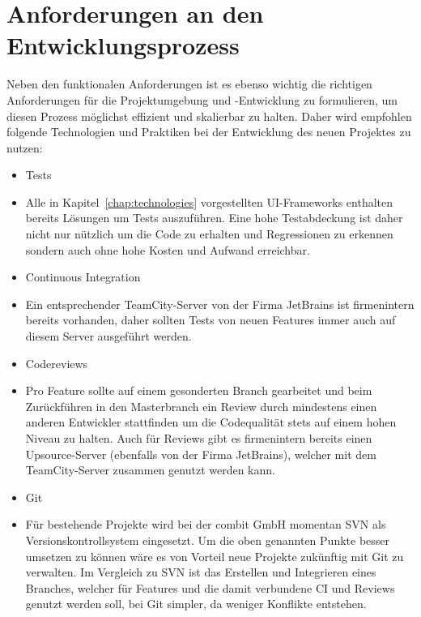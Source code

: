 \section{Anforderungen an den Entwicklungsprozess}
Neben den funktionalen Anforderungen ist es ebenso wichtig die richtigen Anforderungen für die Projektumgebung und -Entwicklung zu formulieren, um diesen Prozess möglichst effizient und skalierbar zu halten. Daher wird empfohlen folgende Technologien und Praktiken bei der Entwicklung des neuen Projektes zu nutzen:
\begin{itemize}
    \item{Tests}
    \item[] Alle in Kapitel~\ref{chap:technologies} vorgestellten UI-Frameworks enthalten bereits Lösungen um Tests auszuführen. Eine hohe Testabdeckung ist daher nicht nur nützlich um die Code zu erhalten und Regressionen zu erkennen sondern auch ohne hohe Kosten und Aufwand erreichbar.
    \item{Continuous Integration}
    \item[] Ein entsprechender TeamCity-Server von der Firma JetBrains ist firmenintern bereits vorhanden, daher sollten Tests von neuen Features immer auch auf diesem Server ausgeführt werden.
    \item{Codereviews}
    \item[] Pro Feature sollte auf einem gesonderten Branch gearbeitet und beim Zurückführen in den Masterbranch ein Review durch mindestens einen anderen Entwickler stattfinden um die Codequalität stets auf einem hohen Niveau zu halten. Auch für Reviews gibt es firmenintern bereits einen Upsource-Server (ebenfalls von der Firma JetBrains), welcher mit dem TeamCity-Server zusammen genutzt werden kann.
    \item{Git}
    \item[] Für bestehende Projekte wird bei der combit GmbH momentan SVN  als Versionskontrollsystem eingesetzt. Um die oben genannten Punkte besser umsetzen zu können wäre es von Vorteil neue Projekte zukünftig mit Git zu verwalten. Im Vergleich zu SVN ist das Erstellen und Integrieren eines Branches, welcher für Features und die damit verbundene CI und Reviews genutzt werden soll, bei Git simpler, da weniger Konflikte entstehen. 
\end{itemize}

